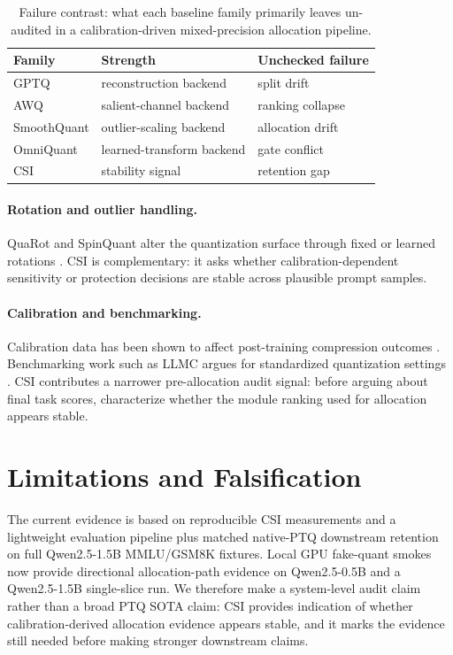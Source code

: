 \documentclass[letterpaper]{article}
\begin{document}
\begin{table}[t]
\centering
\small
\caption{Failure contrast: what each baseline family primarily leaves
un-audited in a calibration-driven mixed-precision allocation pipeline.}
\label{tab:failure-contrast}
\begin{tabular}{lll}
\toprule
Family & Strength & Unchecked failure \\
\midrule
GPTQ & reconstruction backend & split drift \\
AWQ & salient-channel backend & ranking collapse \\
SmoothQuant & outlier-scaling backend & allocation drift \\
OmniQuant & learned-transform backend & gate conflict \\
CSI & stability signal & retention gap \\
\bottomrule
\end{tabular}
\end{table}

\paragraph{Rotation and outlier handling.}
QuaRot and SpinQuant alter the quantization surface through fixed or learned
rotations \citep{ashkboos2024quarot,liu2024spinquant}. CSI is complementary:
it asks whether calibration-dependent sensitivity or protection decisions are
stable across plausible prompt samples.

\paragraph{Calibration and benchmarking.}
Calibration data has been shown to affect post-training compression outcomes
\citep{calibrationimpact2023}. Benchmarking work such as LLMC argues for
standardized quantization settings \citep{llmc2024}. CSI contributes a narrower
pre-allocation audit signal: before arguing about final task scores, characterize
whether the module ranking used for allocation appears stable.

\section{Limitations and Falsification}

The current evidence is based on reproducible CSI measurements and a lightweight
evaluation pipeline plus matched native-PTQ downstream retention on full Qwen2.5-1.5B
MMLU/GSM8K fixtures. Local GPU fake-quant smokes now provide directional
allocation-path evidence on Qwen2.5-0.5B and a Qwen2.5-1.5B single-slice run.
We therefore make a system-level audit claim rather than a broad PTQ SOTA
claim: CSI provides indication of whether calibration-derived allocation
evidence appears stable, and it marks the evidence still needed before making
stronger downstream claims.
\end{document}

